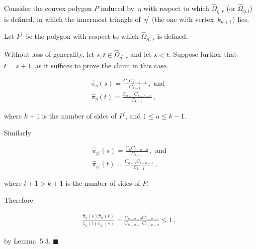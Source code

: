 \documentclass[10pt,a4paper]{article}
\begin{document}
Consider the convex polygon $P$ induced by $\eta$ with respect to which $\hat{\Omega}_{\eta,r}$ (or $\hat{\Omega}_{\eta,l}$) is defined, in which the innermost triangle of $\eta^{\prime}$ (the one with vertex $k_{d+1}$) lies.\par




Let $P^{\prime}$ be the polygon with respect to which $\hat{\Omega}_{\eta^{\prime},r}$ is defined.\par




Without loss of generality, let $s,t\in\hat{\Omega}_{\eta^{\prime},r}$ and let $s<t$. Suppose further that $t=s+1$, as it suffices to prove the claim in this case.\par




\[\begin{gathered}
\displaystyle\hat{\pi}_{\eta}(s) \displaystyle=\frac{C_{a}C_{k-a-2}}{C_{k-1}}\,,\mbox{ and } \\
\displaystyle\hat{\pi}_{\eta}(t) \displaystyle=\frac{C_{a-1}C_{k-a-1}}{C_{k-1}}\,,
\end{gathered}\]


where $k+1$ is the number of sides of $P^{\prime}$, and $1\leq a\leq k-1$.\par




Similarly\par


\[\begin{gathered}
\displaystyle\hat{\pi}_{\eta^{\prime}}(s) \displaystyle=\frac{C_{a}C_{l-a-2}}{C_{l-1}}\,,\mbox{ and} \\
\displaystyle\hat{\pi}_{\eta^{\prime}}(t) \displaystyle=\frac{C_{a-1}C_{l-a-1}}{C_{l-1}}\,,
\end{gathered}\]


where $l+1>k+1$ is the number of sides of $P$.\par




Therefore\par


\[\begin{gathered}
\frac{\hat{\pi}_{\eta}(s)\hat{\pi}_{\eta^{\prime}}(t)}{\hat{\pi}_{\eta}(t)\hat{\pi}_{\eta^{\prime}}(s)}=\frac{C_{k-a-2}C_{l-a-1}}{C_{k-a-1}C_{l-a-2}}\leq 1\,,
\end{gathered}\]


by Lemma 5.3.
\ensuremath{\blacksquare}\par
\end{document}
